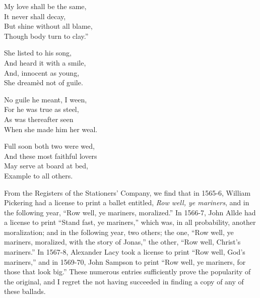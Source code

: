 \begin{dcverse}
\begin{altverse}
My love shall be the same,\\
It never shall decay,\\
But shine without all blame,\\
Though body turn to clay.”
\end{altverse}

\begin{altverse}
She listed to his song,\\
And heard it with a smile,\\
And, innocent as young,\\
She dreamèd not of guile.
\end{altverse}

\begin{altverse}
No guile he meant, I ween,\\
For he was true as steel,\\
As was thereafter seen\\
When she made him her weal.
\end{altverse}
\end{dcverse}

\settowidth{\versewidth}{Full soon both two were wed,}
\begin{scverse}
\begin{altverse}
Full soon both two were wed,\\
And these most faithful lovers\\
May serve at board at bed,\\
Example to all others.
\end{altverse}
\end{scverse}
\normalsize
{}

From the Registers of the Stationers’ Company, we find that in 1565-6,
William Pickering had a license to print a ballet entitled, \textit{Row well, ye mariners},
and in the following year, “Row well, ye mariners, moralized.” In 1566-7,
John Allde had a license to print “Stand fast, ye mariners,” which was, in all
probability, another moralization; and in the following year, two others; the one,
“Row well, ye mariners, moralized, with the story of Jonas,” the other, “Row
well, Christ’s mariners.” In 1567-8, Alexander Lacy took a license to print
“Row well, God’s mariners,” and in 1569-70, John Sampson to print “Row
well, ye mariners, for those that look big.” These numerous entries sufficiently
prove the popularity of the original, and I regret the not having succeeded in
finding a copy of any of these ballads.

